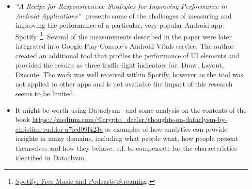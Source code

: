 \begin{itemize}
    \item \emph{``A Recipe for Responsiveness: Strategies for Improving Performance in Android Applications"}~\citep{nilsson2016_a_recipe_for_responsiveness_for_improving_android_apps_spotify_masters} presents some of the challenges of measuring and improving the performance of a particular, very popular Android app: Spotify~\footnote{\href{https://play.google.com/store/apps/details?id=com.spotify.music&hl=en_GB&gl=US}{Spotify: Free Music and Podcasts Streaming}.}. Several of the measurements described in the paper were later integrated into Google Play Console's Android Vitals service. The author created an additional tool that profiles the performance of UI elements and provided the results as three traffic-light indicators for: Draw, Layout, Execute. The work was well received within Spotify, however as the tool was not applied to other apps and is not available the impact of this research seems to be limited.
    
    \item It might be worth using Dataclysm~\citep{rudder2014dataclysm} and some analysis on the contents of the book \url{https://medium.com/@crypto_dealer/thoughts-on-dataclysm-by-christian-rudder-a7fcd09f423c} as examples of how analytics can provide insights in many domains, including what people want, how people present themselves and how they behave. c.f. \citep{GAVIDIACALDERON2021_game_theoretic_analysis_of_software_development_practices} to compensate for the characteristics identified in Dataclysm.
    
\end{itemize}

